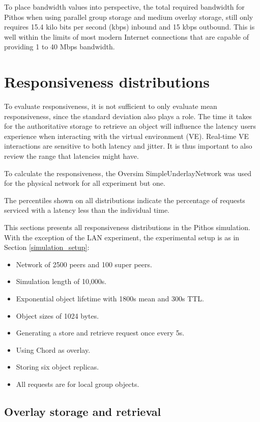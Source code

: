 To place bandwidth values into perspective, the total required bandwidth for Pithos when using parallel group storage and medium overlay storage, still only requires 15.4 kilo bits per second (kbps) inbound and 15 kbps outbound. This is well within the limits of most modern Internet connections that are capable of providing 1 to 40 Mbps bandwidth.

\section{Responsiveness distributions}

To evaluate responsiveness, it is not sufficient to only evaluate mean responsiveness, since the standard deviation also plays a role. The time it takes for the authoritative storage to retrieve an object will influence the latency users experience when interacting with the virtual environment (VE). Real-time VE interactions are sensitive to both latency and jitter. It is thus important to also review the range that latencies might have.

To calculate the responsiveness, the Oversim SimpleUnderlayNetwork was used for the physical network for all experiment but one.

The percentiles shown on all distributions indicate the percentage of requests serviced with a latency less than the individual time.

This sections presents all responsiveness distributions in the Pithos simulation. With the exception of the LAN experiment, the experimental setup is as in Section \ref{simulation_setup}:
%
\begin{itemize}
\item Network of 2500 peers and 100 super peers.
\item Simulation length of 10,000s.
\item Exponential object lifetime with 1800s mean and 300s TTL.
\item Object sizes of 1024 bytes.
\item Generating a store and retrieve request once every 5s.
\item Using Chord as overlay.
\item Storing six object replicas.
\item All requests are for local group objects.
\end{itemize}

\subsection{Overlay storage and retrieval}


